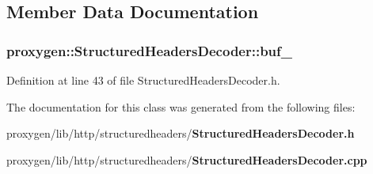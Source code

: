 \subsection{Member Data Documentation}
\subsubsection[{buf\+\_\+}]{ proxygen\+::\+Structured\+Headers\+Decoder\+::buf\+\_\+\hspace{0.3cm}{\ttfamily [private]}}\label{classproxygen_1_1StructuredHeadersDecoder_af142642618114656a1d55b5d62bd30e1}


Definition at line 43 of file Structured\+Headers\+Decoder.\+h.



The documentation for this class was generated from the following files\+:\begin{DoxyCompactItemize}
\item 
proxygen/lib/http/structuredheaders/{\bf Structured\+Headers\+Decoder.\+h}\item 
proxygen/lib/http/structuredheaders/{\bf Structured\+Headers\+Decoder.\+cpp}\end{DoxyCompactItemize}
